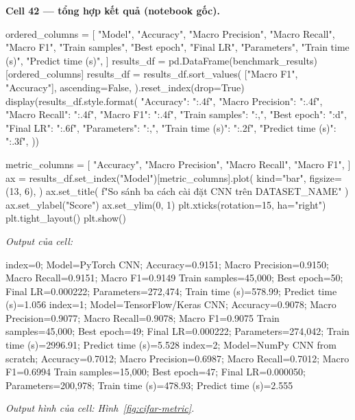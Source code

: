 \documentclass[12pt,a4paper]{report}
\begin{document}
\par\medskip\noindent\textbf{Cell 42 --- tổng hợp kết quả (notebook gốc).}
\begin{NotebookCode}
ordered_columns = [
    "Model",
    "Accuracy",
    "Macro Precision",
    "Macro Recall",
    "Macro F1",
    "Train samples",
    "Best epoch",
    "Final LR",
    "Parameters",
    "Train time (s)",
    "Predict time (s)",
]
results_df = pd.DataFrame(benchmark_results)[ordered_columns]
results_df = results_df.sort_values(
    ["Macro F1", "Accuracy"],
    ascending=False,
).reset_index(drop=True)
display(results_df.style.format({
    "Accuracy": "{:.4f}",
    "Macro Precision": "{:.4f}",
    "Macro Recall": "{:.4f}",
    "Macro F1": "{:.4f}",
    "Train samples": "{:,}",
    "Best epoch": "{:d}",
    "Final LR": "{:.6f}",
    "Parameters": "{:,}",
    "Train time (s)": "{:.2f}",
    "Predict time (s)": "{:.3f}",
}))

metric_columns = [
    "Accuracy",
    "Macro Precision",
    "Macro Recall",
    "Macro F1",
]
ax = results_df.set_index("Model")[metric_columns].plot(
    kind="bar",
    figsize=(13, 6),
)
ax.set_title(
    f"So sánh ba cách cài đặt CNN trên {DATASET_NAME}"
)
ax.set_ylabel("Score")
ax.set_ylim(0, 1)
plt.xticks(rotation=15, ha="right")
plt.tight_layout()
plt.show()
\end{NotebookCode}
\noindent\textit{Output của cell:}
\begin{NotebookOutput}
index=0; Model=PyTorch CNN; Accuracy=0.9151; Macro Precision=0.9150; Macro Recall=0.9151; Macro F1=0.9149
  Train samples=45,000; Best epoch=50; Final LR=0.000222; Parameters=272,474; Train time (s)=578.99; Predict time (s)=1.056
index=1; Model=TensorFlow/Keras CNN; Accuracy=0.9078; Macro Precision=0.9077; Macro Recall=0.9078; Macro F1=0.9075
  Train samples=45,000; Best epoch=49; Final LR=0.000222; Parameters=274,042; Train time (s)=2996.91; Predict time (s)=5.528
index=2; Model=NumPy CNN from scratch; Accuracy=0.7012; Macro Precision=0.6987; Macro Recall=0.7012; Macro F1=0.6994
  Train samples=15,000; Best epoch=47; Final LR=0.000050; Parameters=200,978; Train time (s)=478.93; Predict time (s)=2.555
\end{NotebookOutput}
\noindent\textit{Output hình của cell: Hình~\ref{fig:cifar-metric}.}

\begin{table}[htbp]\centering\caption{Ba CNN trên full test set CIFAR-10}\label{tab:cifar-results}
\end{table}
\end{document}
